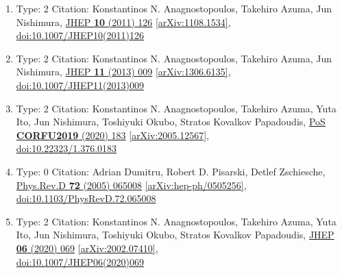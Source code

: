 \documentclass[a4paper,10pt]{article}
\begin{document}
\begin{enumerate}
\begin{enumerate}
  \item Type: 2 Citation: Konstantinos N. Anagnostopoulos, Takehiro Azuma, Jun Nishimura, \href{https://www.doi.org/10.1007/JHEP10(2011)126}{JHEP {\bf 10} (2011) 126}  \href{https://arxiv.org/abs/1108.1534}{[arXiv:1108.1534]},\\\href{https://www.doi.org/10.1007/JHEP10(2011)126}{doi:10.1007/JHEP10(2011)126}
  \item Type: 2 Citation: Konstantinos N. Anagnostopoulos, Takehiro Azuma, Jun Nishimura, \href{https://www.doi.org/10.1007/JHEP11(2013)009}{JHEP {\bf 11} (2013) 009}  \href{https://arxiv.org/abs/1306.6135}{[arXiv:1306.6135]},\\\href{https://www.doi.org/10.1007/JHEP11(2013)009}{doi:10.1007/JHEP11(2013)009}
  \item Type: 2 Citation: Konstantinos N. Anagnostopoulos, Takehiro Azuma, Yuta Ito, Jun Nishimura, Toshiyuki Okubo, Stratos Kovalkov Papadoudis, \href{https://www.doi.org/10.22323/1.376.0183}{PoS {\bf CORFU2019} (2020) 183}  \href{https://arxiv.org/abs/2005.12567}{[arXiv:2005.12567]},\\\href{https://www.doi.org/10.22323/1.376.0183}{doi:10.22323/1.376.0183}
  \item Type: 0 Citation: Adrian Dumitru, Robert D. Pisarski, Detlef Zschiesche, \href{https://www.doi.org/10.1103/PhysRevD.72.065008}{Phys.Rev.D {\bf 72} (2005) 065008}  \href{https://arxiv.org/abs/hep-ph/0505256}{[arXiv:hep-ph/0505256]},\\\href{https://www.doi.org/10.1103/PhysRevD.72.065008}{doi:10.1103/PhysRevD.72.065008}
  \item Type: 2 Citation: Konstantinos N. Anagnostopoulos, Takehiro Azuma, Yuta Ito, Jun Nishimura, Toshiyuki Okubo, Stratos Kovalkov Papadoudis, \href{https://www.doi.org/10.1007/JHEP06(2020)069}{JHEP {\bf 06} (2020) 069}  \href{https://arxiv.org/abs/2002.07410}{[arXiv:2002.07410]},\\\href{https://www.doi.org/10.1007/JHEP06(2020)069}{doi:10.1007/JHEP06(2020)069}

\end{enumerate}
\end{enumerate}
\end{document}
